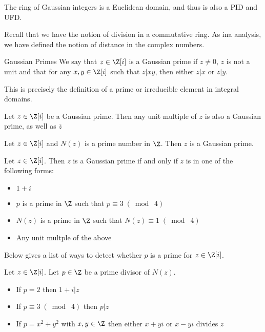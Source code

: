 \documentclass[a4paper]{article}
\begin{document}
\begin{prp}{}{} The ring of Gaussian integers is a Euclidean domain, and thus is also a PID and UFD. 
\end{prp}

Recall that we have the notion of division in a commutative ring. As ina analysis, we have defined the notion of distance in the complex numbers. 

\begin{defn}{Gaussian Primes}{} We say that $z\in\Z[i]$ is a Gaussian prime if $z\neq 0$, $z$ is not a unit and that for any $x,y\in\Z[i]$ such that $z|xy$, then either $z|x$ or $z|y$. 
\end{defn}

This is precisely the definition of a prime or irreducible element in integral domains. 

\begin{prp}{}{} Let $z\in\Z[i]$ be a Gaussian prime. Then any unit multiple of $z$ is also a Gaussian prime, as well as $\overline{z}$
\end{prp}

\begin{lmm}{}{} Let $z\in\Z[i]$ and $N(z)$ is a prime number in $\Z$. Then $z$ is a Gaussian prime. 
\end{lmm}

\begin{thm}{}{} Let $z\in\Z[i]$. Then $z$ is a Gaussian prime if and only if $z$ is in one of the following forms: 
\begin{itemize}
\item $1+i$
\item $p$ is a prime in $\Z$ such that $p\equiv 3\;(\bmod\;4)$
\item $N(z)$ is a prime in $\Z$ such that $N(z)\equiv 1\;(\bmod\;4)$
\item Any unit multple of the above
\end{itemize}
\end{thm}

Below gives a list of ways to detect whether $p$ is a prime for $z\in\Z[i]$. 

\begin{prp}{}{} Let $z\in\Z[i]$. Let $p\in\Z$ be a prime divisor of $N(z)$. 
\begin{itemize}
\item If $p=2$ then $1+i|z$
\item If $p\equiv 3\;(\bmod\;4)$ then $p|z$
\item If $p=x^2+y^2$ with $x,y\in\Z$ then either $x+yi$ or $x-yi$ divides $z$
\end{itemize}
\end{prp}
\end{document}
